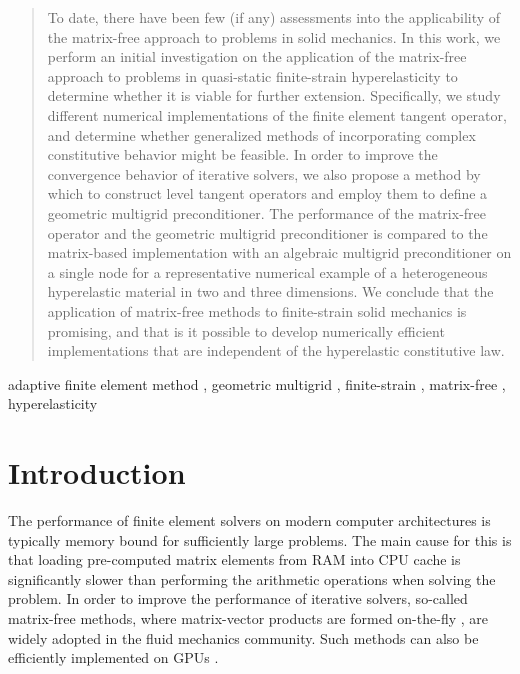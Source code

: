 \documentclass[times,doublespace]{nmeauth}
\begin{document}
\begin{frontmatter}
\begin{abstract}
    To date, there have been few (if any) assessments into the applicability of the matrix-free approach to problems in solid mechanics.
    In this work, we perform an initial investigation on the application of the matrix-free approach to problems in quasi-static finite-strain hyperelasticity to determine whether it is viable for further extension.
    Specifically, we study different numerical implementations of the finite element tangent operator, and determine whether generalized methods of incorporating complex constitutive behavior might be feasible.
    In order to improve the convergence behavior of iterative solvers, we also propose a method by which to construct level tangent operators
    and employ them to define a geometric multigrid preconditioner.
    The performance of the matrix-free operator and the geometric multigrid preconditioner is compared to the matrix-based implementation with an algebraic multigrid preconditioner on a single node for a representative numerical example of a heterogeneous hyperelastic material in two and three dimensions.
    We conclude that the application of matrix-free methods to finite-strain solid mechanics is promising, and that is it possible to develop numerically efficient implementations that are independent of the hyperelastic constitutive law.
  \end{abstract}

\ifijnme


  \maketitle

\else
    \begin{keyword}
        adaptive finite element method \sep
        geometric multigrid \sep
        finite-strain \sep
        matrix-free \sep
        hyperelasticity
    \end{keyword}

\end{frontmatter}
\fi

\section{Introduction}

The performance of finite element solvers on modern computer architectures is typically memory bound for sufficiently large problems.
The main cause for this is that loading pre-computed matrix elements from RAM into CPU cache is significantly slower than performing the arithmetic operations when solving the problem.
In order to improve the performance of iterative solvers, so-called matrix-free methods,
where matrix-vector products are formed on-the-fly \cite{kronbichler12,May2015, Krank2017, Brown2010, Gmeiner2016},
are widely adopted in the fluid mechanics community.
Such methods can also be efficiently implemented on GPUs \cite{Abdelfattah2016, ljungkvist2017multigrid}.
\end{document}
